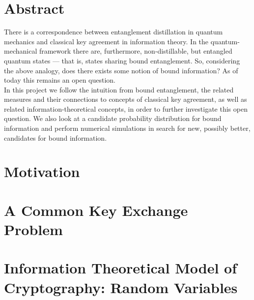 \documentclass[titlepage]{report}
\theoremstyle{remark}
\begin{document}


\chapter*{Abstract}
There is a correspondence between entanglement distillation in quantum mechanics and classical key agreement in information theory. 
In the quantum-mechanical framework there are, furthermore, non-distillable, but entangled quantum states --- that is, states sharing bound entanglement. 
So, considering the above analogy, does there exists some notion of bound information? As of today this remains an open question.\\
In this project we follow the intuition from bound entanglement, the related measures and their connections to concepts of classical key agreement, as well as related information-theoretical concepts, in order to further investigate this open question.
We also look at a candidate probability distribution for bound information and perform numerical simulations in search for new, possibly better, candidates for bound information.


\tableofcontents

%

\chapter{Motivation}

		
 \chapter{A Common Key Exchange Problem}
 
\chapter{Information Theoretical Model of Cryptography: Random Variables}

\end{document}
